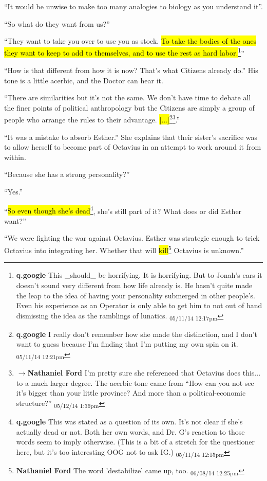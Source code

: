 ``It would be unwise to make too many analogies to biology as you understand it''.

``So what do they want from us?''

``They want to take you over to use you as stock.  \hl{To take the bodies of the ones they want to keep to add to themselves, and to use the rest as hard labor.}\footnote{\textbf{q.google }This \_should\_ be horrifying.  It is horrifying.  But to Jonah's ears it doesn't sound very different from how life already is.  He hasn't quite made the leap to the idea of having your personality submerged in other people's.  Even his experience as an Operator is only able to get him to not out of hand dismissing the idea as the ramblings of lunatics. \textsubscript{05/11/14 12:17pm}}''

``How is that different from how it is now?  That's what Citizens already do.''  His tone is a little acerbic, and the Doctor can hear it.

``There are similarities but it's not the same.  We don't have time to debate all the finer points of political anthropology but the Citizens are simply a group of people who arrange the rules to their advantage. \hl{{[}...{]}}\footnote{\textbf{q.google }I really don't remember how she made the distinction, and I don't want to guess because I'm finding that I'm putting my own spin on it. \textsubscript{05/11/14 12:21pm}}\footnote{$\rightarrow$\textbf{Nathaniel Ford }I'm pretty sure she referenced that Octavius does this... to a much larger degree. The acerbic tone came from ``How can you not see it's bigger than your little province? And more than a political-economic structure?'' \textsubscript{05/12/14 1:36pm}}.''

``It was a mistake to absorb Esther.''  She explains that their sister's sacrifice was to allow herself to become part of Octavius in an attempt to work around it from within.

``Because she has a strong personality?''

``Yes.''

``\hl{So even though she's dead}\footnote{\textbf{q.google }This was stated as a question of its own.  It's not clear if she's actually dead or not.  Both her own words, and Dr. G's reaction to those words seem to imply otherwise.  (This is a bit of a stretch for the questioner here, but it's too interesting OOG not to ask IG.) \textsubscript{05/11/14 12:15pm}}, she's still part of it?  What does or did Esther want?''

``We were fighting the war against Octavius.  Esther was strategic enough to trick Octavius into integrating her.  Whether that will \hl{kill}\footnote{\textbf{Nathaniel Ford }The word 'destabilize' came up, too. \textsubscript{06/08/14 12:25pm}} Octavius is unknown.''

